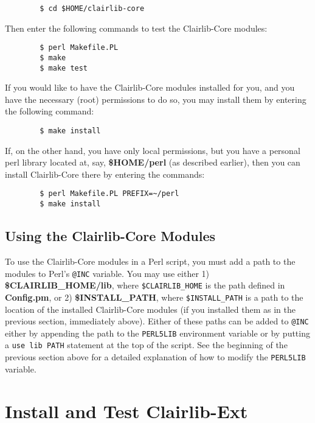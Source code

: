 \begin{verbatim}
        $ cd $HOME/clairlib-core
\end{verbatim}


Then enter the following commands to test the Clairlib-Core modules:

\begin{verbatim}
        $ perl Makefile.PL
        $ make
        $ make test
\end{verbatim}


If you would like to have the Clairlib-Core modules installed for you, and you have the necessary (root) permissions to do so, you may install them by entering the following command:

\begin{verbatim}
        $ make install
\end{verbatim}


If, on the other hand, you have only local permissions, but you have a personal perl library located at, say, \textbf{\$HOME/perl} (as described earlier), then you can install Clairlib-Core there by entering the commands:

\begin{verbatim}
        $ perl Makefile.PL PREFIX=~/perl
        $ make install
\end{verbatim}
\subsection*{Using the Clairlib-Core Modules\label{Using_the_Clairlib-Core_Modules}}


To use the Clairlib-Core modules in a Perl script, you must add a path to the modules to Perl's \texttt{@INC} variable. You may use either 1) \textbf{\$CLAIRLIB\_HOME/lib}, where \texttt{\$CLAIRLIB\_HOME} is the path defined in \textbf{Config.pm}, or 2) \textbf{\$INSTALL\_PATH}, where \texttt{\$INSTALL\_PATH} is a path to the location of the installed Clairlib-Core modules (if you installed them as in the previous section, immediately above). Either of these paths can be added to \texttt{@INC} either by appending the path to the \texttt{PERL5LIB} environment variable or by putting a \texttt{use lib PATH} statement at the top of the script. See the beginning of the previous section above for a detailed explanation of how to modify the \texttt{PERL5LIB} variable.

\section{Install and Test Clairlib-Ext\label{Install_and_Test_Clairlib-Ext}}


